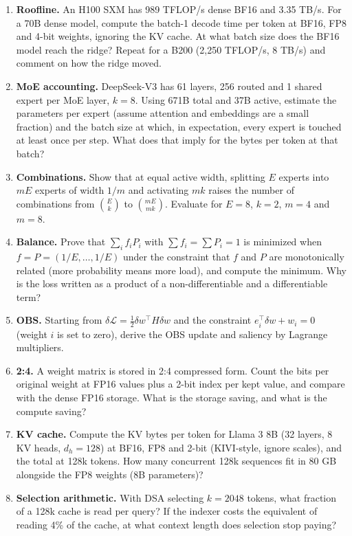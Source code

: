 \documentclass[11pt,letterpaper]{article}
\begin{document}
\begin{enumerate}[leftmargin=1.6em,itemsep=6pt]
\item \textbf{Roofline.} An H100 SXM has 989 TFLOP/s dense BF16 and 3.35 TB/s. For a 70B dense model, compute the batch-1 decode time per token at BF16, FP8 and 4-bit weights, ignoring the KV cache. At what batch size does the BF16 model reach the ridge? Repeat for a B200 (2,250 TFLOP/s, 8 TB/s) and comment on how the ridge moved.
\item \textbf{MoE accounting.} DeepSeek-V3 has 61 layers, 256 routed and 1 shared expert per MoE layer, $k=8$. Using 671B total and 37B active, estimate the parameters per expert (assume attention and embeddings are a small fraction) and the batch size at which, in expectation, every expert is touched at least once per step. What does that imply for the bytes per token at that batch?
\item \textbf{Combinations.} Show that at equal active width, splitting $E$ experts into $mE$ experts of width $1/m$ and activating $mk$ raises the number of combinations from $\binom{E}{k}$ to $\binom{mE}{mk}$. Evaluate for $E=8$, $k=2$, $m=4$ and $m=8$.
\item \textbf{Balance.} Prove that $\sum_if_iP_i$ with $\sum f_i=\sum P_i=1$ is minimized when $f=P=(1/E,\dots,1/E)$ under the constraint that $f$ and $P$ are monotonically related (more probability means more load), and compute the minimum. Why is the loss written as a product of a non-differentiable and a differentiable term?
\item \textbf{OBS.} Starting from $\delta\mathcal{L}=\tfrac12\delta w^\top H\delta w$ and the constraint $e_i^\top\delta w+w_i=0$ (weight $i$ is set to zero), derive the OBS update and saliency by Lagrange multipliers.
\item \textbf{2:4.} A weight matrix is stored in 2:4 compressed form. Count the bits per original weight at FP16 values plus a 2-bit index per kept value, and compare with the dense FP16 storage. What is the storage saving, and what is the compute saving?
\item \textbf{KV cache.} Compute the KV bytes per token for Llama 3 8B (32 layers, 8 KV heads, $d_h=128$) at BF16, FP8 and 2-bit (KIVI-style, ignore scales), and the total at 128k tokens. How many concurrent 128k sequences fit in 80 GB alongside the FP8 weights (8B parameters)?
\item \textbf{Selection arithmetic.} With DSA selecting $k=2048$ tokens, what fraction of a 128k cache is read per query? If the indexer costs the equivalent of reading 4\% of the cache, at what context length does selection stop paying?

\end{enumerate}
\end{document}
